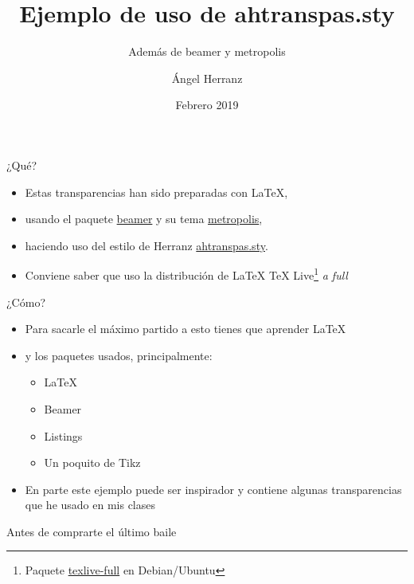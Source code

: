 \documentclass[14pt]{beamer}
\title{Ejemplo de uso de ahtranspas.sty}
\subtitle{Además de beamer y metropolis}
\date{Febrero 2019}
\author[Herranz]{Ángel Herranz}
\institute{Universidad Politécnica de Madrid}
\begin{document}
\maketitle

\begin{frame}{¿Qué?}
  \begin{itemize}
  \item Estas transparencias han sido preparadas con \alert{LaTeX},
  \item usando el paquete \alert{\url{beamer}} y su tema \alert{\url{metropolis}},
  \item haciendo uso del estilo de Herranz \url{ahtranspas.sty}.
  \item Conviene saber que uso la distribución de LaTeX \alert{TeX Live}\footnote{Paquete \url{texlive-full} en Debian/Ubuntu} \emph{a full}
  \end{itemize}
\end{frame}

\begin{frame}{¿Cómo?}
  \begin{itemize}
  \item Para sacarle el máximo partido a esto tienes que aprender LaTeX
  \item y los paquetes usados, principalmente:
    \begin{itemize}
    \item LaTeX
    \item Beamer
    \item Listings
    \item Un poquito de Tikz
    \end{itemize}
  \item En parte este ejemplo puede ser inspirador y contiene algunas transparencias que he usado en mis clases
  \end{itemize}
\end{frame}
  
{
  \begin{frame}{Antes de comprarte el último baile}
  \end{frame}
}
\end{document}
